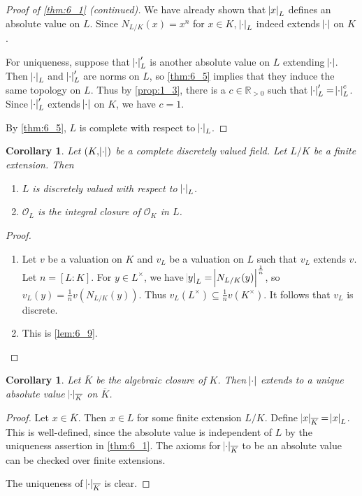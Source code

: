 \documentclass[11pt]{article}
\theoremstyle{definition}
\theoremstyle{plain}
\newtheorem{corollary}[definition]{Corollary}
\theoremstyle{remark}
\newcommand{\bR}{\mathbb{R}}
\newcommand{\cO}{\mathcal{O}}
\begin{document}
\begin{proof}[Proof of \autoref{thm:6_1} (continued)]
    We have already shown that $\abs{x}_L$ defines an absolute value on $L$. Since $N_{L/K}(x) = x^n$ for $x \in K$, $\abs{\cdot}_L$ indeed extends $\abs{\cdot}$ on $K$.

    For uniqueness, suppose that $\abs{\cdot}'_L$ is another absolute value on $L$ extending $\abs{\cdot}$. Then $\abs{\cdot}_L$ and $\abs{\cdot}'_L$ are norms on $L$, so \autoref{thm:6_5} implies that they induce the same topology on $L$. Thus by \autoref{prop:1_3}, there is a $c \in \bR_{>0}$ such that $\abs{\cdot}'_L = \abs{\cdot}_L^c$. Since $\abs{\cdot}'_L$ extends $\abs{\cdot}$ on $K$, we have $c = 1$.

    By \autoref{thm:6_5}, $L$ is complete with respect to $\abs{\cdot}_L$.
\end{proof}

\begin{corollary}\label{cor:6_10}
    Let $(K, \abs{\cdot})$ be a complete discretely valued field. Let $L / K$ be a finite extension. Then
    \begin{enumerate}
        \item $L$ is discretely valued with respect to $\abs{\cdot}_L$.
        \item $\cO_L$ is the integral closure of $\cO_K$ in $L$.
    \end{enumerate}
\end{corollary}
\begin{proof}\phantom{}
    \begin{enumerate}
        \item Let $v$ be a valuation on $K$ and $v_L$ be a valuation on $L$ such that $v_L$ extends $v$. Let $n = [L : K]$. For $y \in L^\times$, we have $\abs{y}_L = \abs{N_{L/K}(y)}^\frac{1}{n}$, so $v_L(y) = \frac{1}{n} v(N_{L/K}(y))$. Thus $v_L(L^\times) \subseteq \frac{1}{n} v(K^\times)$. It follows that $v_L$ is discrete.

        \item This is \autoref{lem:6_9}.\qedhere
    \end{enumerate}
\end{proof}

\begin{corollary}\label{cor:6_11}
    Let $\overline{K}$ be the algebraic closure of $K$. Then $\abs{\cdot}$ extends to a unique absolute value $\abs{\cdot}_{\overline{K}}$ on $\overline{K}$.
\end{corollary}
\begin{proof}
    Let $x \in \overline{K}$. Then $x \in L$ for some finite extension $L/K$. Define $\abs{x}_{\overline{K}} = \abs{x}_L$. This is well-defined, since the absolute value is independent of $L$ by the uniqueness assertion in \autoref{thm:6_1}. The axioms for $\abs{\cdot}_{\overline{K}}$ to be an absolute value can be checked over finite extensions.

    The uniqueness of $\abs{\cdot}_{\overline{K}}$ is clear.
\end{proof}
\end{document}
